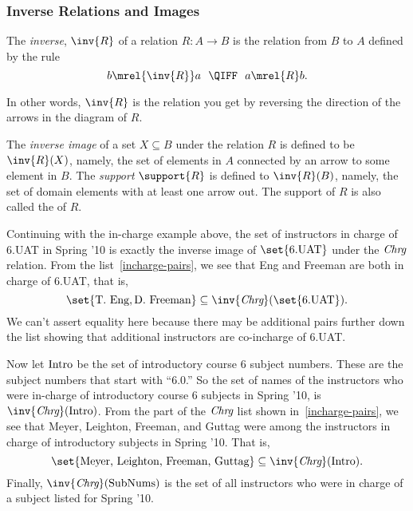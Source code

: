 \subsubsection{Inverse Relations and Images}

\begin{definition}
The \emph{inverse}, $\inv{R}$ of a relation $R: A \to B$ is the
relation from $B$ to $A$ defined by the rule
\[
b \mrel{\inv{R}} a\ \ \QIFF\ \ a \mrel{R} b.
\]
\end{definition}
In other words, $\inv{R}$ is the relation you get by reversing the
direction of the arrows in the diagram of $R$.

\begin{definition}
The \emph{inverse image}  of a set
$X \subseteq B$ under the relation $R$ is defined to be $\inv{R}(X)$,
namely, the set of elements in $A$ connected by an arrow to some
element in $B$.  The \emph{support} 
$\support{R}$ is defined to $\inv{R}(B)$, namely, the set of domain
elements with at least one arrow out.  The support of $R$ is also
called the 
of $R$.
\end{definition}

Continuing with the in-charge example above, the set of instructors in
charge of 6.UAT in Spring '10 is exactly the inverse image of
$\set{\text{6.UAT}}$ under the $\textit{Chrg}$ relation.  From the
list~\eqref{incharge-pairs}, we see that Eng and Freeman are both in
charge of 6.UAT, that is,
\[
\set{\text{T. Eng}, \text{D. Freeman}} \subseteq \inv{\inchrg}(\set{\text{6.UAT}}).
\]
We can't assert equality here because there may be additional pairs
further down the list showing that additional instructors are
co-incharge of 6.UAT.

Now let $\text{Intro}$ be the set of introductory course 6 subject
numbers.  These are the subject numbers that start with ``6.0.''  So
the set of names of the instructors who were in-charge of introductory
course 6 subjects in Spring '10, is $\inv{\inchrg}(\introsub)$.  From
the part of the $\textit{Chrg}$ list shown in~\eqref{incharge-pairs}, we see
that Meyer, Leighton, Freeman, and Guttag were among the instructors
in charge of introductory subjects in Spring '10.  That is,
\[
\set{\text{Meyer, Leighton, Freeman, Guttag}} \subseteq \inv{\inchrg}(\introsub).
\]
Finally, $\inv{\inchrg}(\subnums)$ is the set of all instructors who
were in charge of a subject listed for Spring '10.



